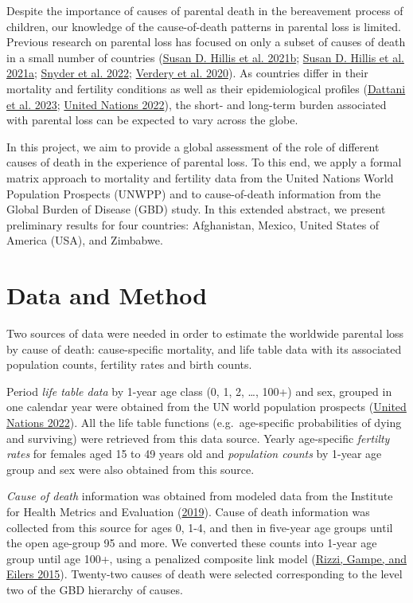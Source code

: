 \documentclass[
  11pt,
  letterpaper,
]{article}
\begin{document}
Despite the importance of causes of parental death in the bereavement process of children, our knowledge of the cause-of-death patterns in parental loss is limited. Previous research on parental loss has focused on only a subset of causes of death in a small number of countries (\protect\hyperlink{ref-hillis2021global}{Susan D. Hillis et al. 2021b}; \protect\hyperlink{ref-hillis2021us}{Susan D. Hillis et al. 2021a}; \protect\hyperlink{ref-snyder2022covid}{Snyder et al. 2022}; \protect\hyperlink{ref-verdery2020covid}{Verdery et al. 2020}). As countries differ in their mortality and fertility conditions as well as their epidemiological profiles (\protect\hyperlink{ref-owid-causes-of-death}{Dattani et al. 2023}; \protect\hyperlink{ref-united2022world}{United Nations 2022}), the short- and long-term burden associated with parental loss can be expected to vary across the globe.

In this project, we aim to provide a global assessment of the role of different causes of death in the experience of parental loss. To this end, we apply a formal matrix approach to mortality and fertility data from the United Nations World Population Prospects (UNWPP) and to cause-of-death information from the Global Burden of Disease (GBD) study. In this extended abstract, we present preliminary results for four countries: Afghanistan, Mexico, United States of America (USA), and Zimbabwe.

\hypertarget{data-and-method}{%
\section{Data and Method}\label{data-and-method}}

Two sources of data were needed in order to estimate the worldwide parental loss by cause of death: cause-specific mortality, and life table data with its associated population counts, fertility rates and birth counts.

Period \emph{life table data} by 1-year age class (0, 1, 2, \ldots, 100+) and sex, grouped in one calendar year were obtained from the UN world population prospects (\protect\hyperlink{ref-united2022world}{United Nations 2022}). All the life table functions (e.g.~age-specific probabilities of dying and surviving) were retrieved from this data source. Yearly age-specific \emph{fertilty rates} for females aged 15 to 49 years old and \emph{population counts} by 1-year age group and sex were also obtained from this source.

\emph{Cause of death} information was obtained from modeled data from the Institute for Health Metrics and Evaluation (\protect\hyperlink{ref-ihme2019gbd}{2019}). Cause of death information was collected from this source for ages 0, 1-4, and then in five-year age groups until the open age-group 95 and more. We converted these counts into 1-year age group until age 100+, using a penalized composite link model (\protect\hyperlink{ref-rizzi2015efficient}{Rizzi, Gampe, and Eilers 2015}). Twenty-two causes of death were selected corresponding to the level two of the GBD hierarchy of causes.
\end{document}
